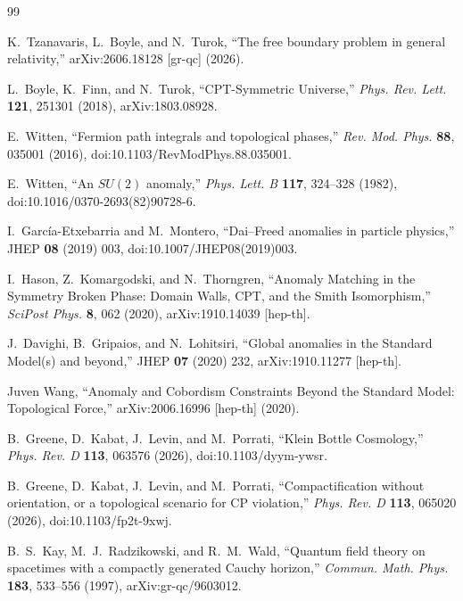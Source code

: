 \documentclass[11pt]{article}
\theoremstyle{canonmath}
\theoremstyle{canonpostulate}
\theoremstyle{canonclaim}
\newcommand{\CanonBibliographySetup}{%
  \small
  \setlength{\parskip}{0.22em}
  \setlength{\itemsep}{0.55em}
}
\begin{document}
\newpage
{}
{}
\begin{thebibliography}{99}
\CanonBibliographySetup

K.~Tzanavaris, L.~Boyle, and N.~Turok, ``The free boundary problem in general relativity,'' arXiv:2606.18128 [gr-qc] (2026).

L.~Boyle, K.~Finn, and N.~Turok, ``CPT-Symmetric Universe,'' \textit{Phys. Rev. Lett.} \textbf{121}, 251301 (2018), arXiv:1803.08928.

E.~Witten, ``Fermion path integrals and topological phases,'' \textit{Rev. Mod. Phys.} \textbf{88}, 035001 (2016), doi:10.1103/RevModPhys.88.035001.

E.~Witten, ``An $SU(2)$ anomaly,'' \textit{Phys. Lett. B} \textbf{117}, 324--328 (1982), doi:10.1016/0370-2693(82)90728-6.

I.~Garc\'ia-Etxebarria and M.~Montero, ``Dai--Freed anomalies in particle physics,'' JHEP \textbf{08} (2019) 003, doi:10.1007/JHEP08(2019)003.

I.~Hason, Z.~Komargodski, and N.~Thorngren, ``Anomaly Matching in the Symmetry Broken Phase: Domain Walls, CPT, and the Smith Isomorphism,'' \textit{SciPost Phys.} \textbf{8}, 062 (2020), arXiv:1910.14039 [hep-th].

J.~Davighi, B.~Gripaios, and N.~Lohitsiri, ``Global anomalies in the Standard Model(s) and beyond,'' JHEP \textbf{07} (2020) 232, arXiv:1910.11277 [hep-th].

Juven Wang, ``Anomaly and Cobordism Constraints Beyond the Standard Model: Topological Force,'' arXiv:2006.16996 [hep-th] (2020).

B.~Greene, D.~Kabat, J.~Levin, and M.~Porrati, ``Klein Bottle Cosmology,'' \textit{Phys. Rev. D} \textbf{113}, 063576 (2026), doi:10.1103/dyym-ywsr.

B.~Greene, D.~Kabat, J.~Levin, and M.~Porrati, ``Compactification without orientation, or a topological scenario for CP violation,'' \textit{Phys. Rev. D} \textbf{113}, 065020 (2026), doi:10.1103/fp2t-9xwj.

B.~S.~Kay, M.~J.~Radzikowski, and R.~M.~Wald, ``Quantum field theory on spacetimes with a compactly generated Cauchy horizon,'' \textit{Commun. Math. Phys.} \textbf{183}, 533--556 (1997), arXiv:gr-qc/9603012.


\end{thebibliography}
\end{document}
